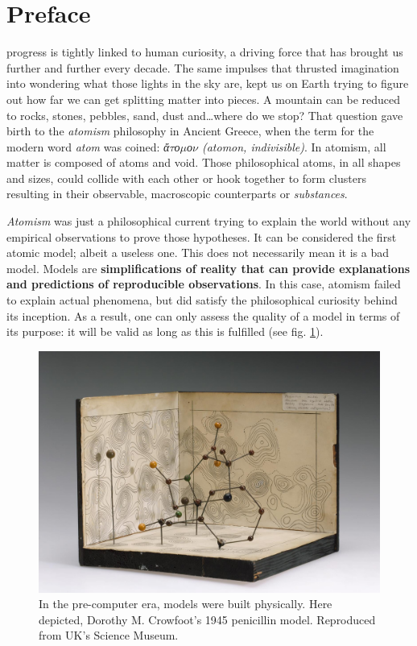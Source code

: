 
\chapter*{Preface}
\label{chap:preface}

 progress is tightly linked to human curiosity, a driving force that has brought us further and further every decade. The same impulses that thrusted imagination into wondering what those lights in the sky are, kept us on Earth trying to figure out how far we can get splitting matter into pieces. A mountain can be reduced to rocks, stones, pebbles, sand, dust and\ldots  where do we stop? That question gave birth to the \textit{atomism} philosophy in Ancient Greece, when the term for the modern word \textit{atom} was coined: \textit{ἄ$\tau$ο$\mu$ο$\nu$ (atomon, indivisible)}. In atomism, all matter is composed of atoms and void. Those philosophical atoms, in all shapes and sizes, could collide with each other or hook together to form clusters resulting in their observable, macroscopic counterparts or \textit{substances}.

\textit{Atomism} was just a philosophical current trying to explain the world without any empirical observations to prove those hypotheses. It can be considered the first atomic model; albeit a useless one. This does not necessarily mean it is a bad model. Models are \textbf{simplifications of reality that can provide explanations and predictions of reproducible observations}. In this case, atomism failed to explain actual phenomena, but did satisfy the philosophical curiosity behind its inception. As a result, one can only assess the quality of a model in terms of its purpose: it will be valid as long as this is fulfilled (see fig. \ref{fig:penicillin}).



\begin{figure}[H]
	\includegraphics[width=\textwidth]{./figures/01/penicillin.jpg}
	\cprotect\caption[Dorothy M. Crowfoot's 1945 Penicillin model]{In the pre-computer era, models were built physically. Here depicted, Dorothy M. Crowfoot's 1945 penicillin model. Reproduced from UK's Science Museum.\cite{uksciencemuseum}}
	\label{fig:penicillin}
\end{figure}


